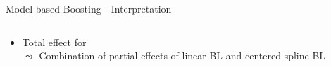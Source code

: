 \documentclass[11pt,compress,t,notes=noshow, aspectratio=169, xcolor=table]{beamer}
\begin{document}
\begin{frame}{Model-based Boosting - Interpretation}
\begin{columns}[T]
{\begin{column}{0.5\textwidth}
\end{column}
}
\end{columns}
\begin{itemize}
     \item<2-> Total effect for \\
$\leadsto$ Combination of partial effects of linear BL and centered spline BL
\end{itemize}
\end{frame}










\end{document}

